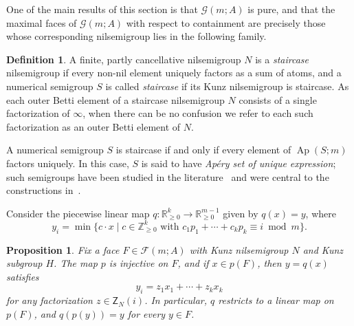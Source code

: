 \documentclass[10pt,a4paper]{amsart}
\newcommand\ZZ{\mathbb{Z}}
\newcommand\RR{\mathbb{R}}
\DeclareMathOperator\Ap{Ap}
\newtheorem{prop}[thm]{Proposition}
\theoremstyle{definition}\newtheorem{defi}[thm]{Definition}
\begin{document}
One of the main results of this section is that $\mathcal G(m;A)$ is pure, and that the maximal faces of $\mathcal G(m;A)$ with respect to containment are precisely those whose corresponding nilsemigroup lies in the following family.  

\begin{defi}\label{d:staircaseposet}
A finite, partly cancellative nilsemigroup $N$ is a \emph{staircase} nilsemigroup if every non-nil element uniquely factors as a sum of atoms, and a numerical semigroup $S$ is called \emph{staircase} if its Kunz nilsemigroup is staircase.  As each outer Betti element of a staircase nilsemigroup $N$ consists of a single factorization of $\infty$, when there can be no confusion we refer to each such factorization as an outer Betti element of $N$.  
\end{defi}

A numerical semigroup $S$ is staircase if and only if every element of $\Ap(S;m)$ factors uniquely.  
In this case, $S$ is said to have \emph{Ap\'ery set of unique expression}; such semigroups have been studied in the literature~\cite{rosalesapery} and were central to the constructions in~\cite{minprescard}.  

\setcounter{thm}{3}
Consider the piecewise linear map $q:\RR_{\ge 0}^k \to \RR_{\ge 0}^{m-1}$ given by $q(x) = y$, where
$$y_i = \min\{c \cdot x \mid c \in \ZZ_{\ge 0}^k \text{ with } c_1p_1 + \cdots + c_kp_k \equiv i \bmod m\}.$$

\begin{prop}\label{p:circleoflightsinverse}
Fix a face $F \in \mathcal F(m; A)$ with Kunz nilsemigroup $N$ and Kunz subgroup $H$.  The map $p$ is injective on $F$, and if $x \in p(F)$, then $y = q(x)$ satisfies
$$y_i = z_1 x_1 + \cdots + z_k x_k$$
for any factorization $z \in \mathsf Z_N(i)$.  In particular, $q$ restricts to a linear map on $p(F)$, and $q(p(y)) = y$ for every $y \in F$.  
\end{prop}
\end{document}
